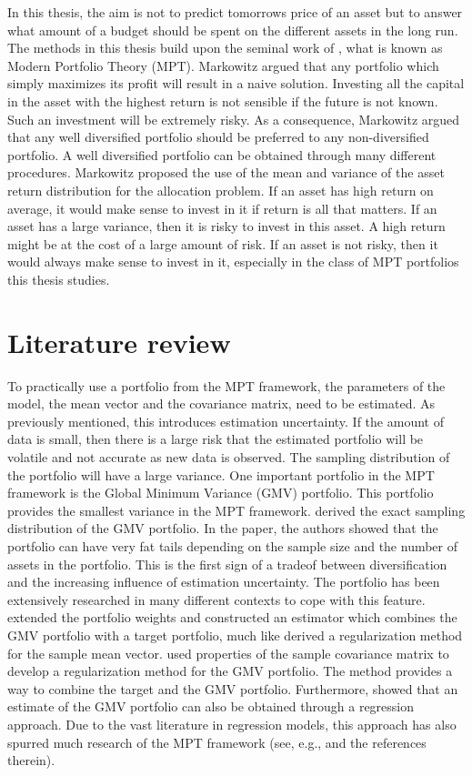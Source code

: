 In this thesis, the aim is not to predict tomorrows price of an asset but to answer what amount of a budget should be spent on the different assets in the long run.
The methods in this thesis build upon the seminal work of \citet{markowitz1959portfolio}, what is known as Modern Portfolio Theory (MPT).
Markowitz argued that any portfolio which simply maximizes its profit will result in a naive solution.
Investing all the capital in the asset with the highest return is not sensible if the future is not known.
Such an investment will be extremely risky. 
As a consequence, Markowitz argued that any well diversified portfolio should be preferred to any non-diversified portfolio. 
A well diversified portfolio can be obtained through many different procedures.
Markowitz proposed the use of the mean and variance of the asset return distribution for the allocation problem.
If an asset has high return on average, it would make sense to invest in it if return is all that matters.
If an asset has a large variance, then it is risky to invest in this asset. 
A high return might be at the cost of a large amount of risk.
If an asset is not risky, then it would always make sense to invest in it, especially in the class of MPT portfolios this thesis studies.

\section{Literature review}
To practically use a portfolio from the MPT framework, the parameters of the model, the mean vector and the covariance matrix, need to be estimated.
As previously mentioned, this introduces estimation uncertainty.
If the amount of data is small, then there is a large risk that the estimated portfolio will be volatile and not accurate as new data is observed.
The sampling distribution of the portfolio will have a large variance.
One important portfolio in the MPT framework is the Global Minimum Variance (GMV) portfolio.
This portfolio provides the smallest variance in the MPT framework.
\citet{okhrin2006distributional} derived the exact sampling distribution of the GMV portfolio. 
In the paper, the authors showed that the portfolio can have very fat tails depending on the sample size and the number of assets in the portfolio.
This is the first sign of a tradeof between diversification and the increasing influence of estimation uncertainty.
The portfolio has been extensively researched in many different contexts to cope with this feature.
\citet{frahm2010} extended the portfolio weights and constructed an estimator which combines the GMV portfolio with a target portfolio, much like \citet{stein1956} derived a regularization method for the sample mean vector. 
\citet{frahm2010} used properties of the sample covariance matrix to develop a regularization method for the GMV portfolio.
The method provides a way to combine the target and the GMV portfolio.
Furthermore, \citet{kempf2006estimating} showed that an estimate of the GMV portfolio can also be obtained through a regression approach.
Due to the vast literature in regression models, this approach has also spurred much research of the MPT framework (see, e.g., \citet{maillet2015global} and the references therein).

